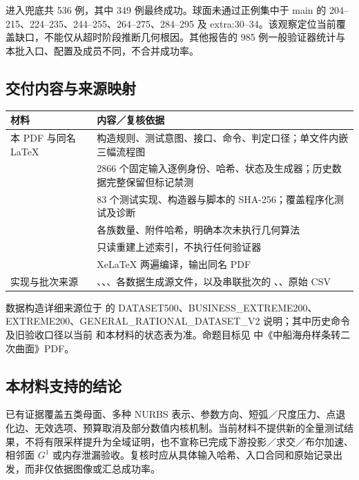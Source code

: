 \documentclass[UTF8,zihao=5,fontset=windows,a4paper]{ctexart}
\begin{document}
进入兜底共 536 例，其中 349 例最终成功。球面未通过正例集中于 main 的 204--215、224--235、244--255、264--275、284--295 及 extra:30--34。该观察定位当前覆盖缺口，不能仅从超时阶段推断几何根因。其他报告的 985 例一般验证器统计与本批入口、配置及成员不同，不合并成功率。

\subsection{交付内容与来源映射}
\begin{center}\small\renewcommand{\arraystretch}{1.16}
\begin{tabularx}{\linewidth}{@{}p{43mm}Y@{}}\toprule
材料 & 内容／复核依据\\\midrule
本 PDF 与同名 LaTeX & 构造规则、测试意图、接口、命令、判定口径；单文件内嵌三幅流程图\\
 & 2866 个固定输入逐例身份、哈希、状态及生成器；历史数据完整保留但标记禁测\\
 & 83 个测试实现、构造器与脚本的 SHA-256；覆盖程序化测试及诊断\\
 & 各族数量、附件哈希，明确本次未执行几何算法\\
 & 只读重建上述索引，不执行任何验证器\\
 & XeLaTeX 两遍编译，输出同名 PDF\\
实现与批次来源 & 、、、各数据生成源文件，以及串联批次的 、、原始 CSV\\\bottomrule
\end{tabularx}
\end{center}
数据构造详细来源位于  的 DATASET500、BUSINESS\_EXTREME200、EXTREME200、GENERAL\_RATIONAL\_DATASET\_V2 说明；其中历史命令及旧验收口径以当前  和本材料的状态表为准。命题目标见  中《中船海舟样条转二次曲面》PDF。

\subsection{本材料支持的结论}
已有证据覆盖五类母面、多种 NURBS 表示、参数方向、短弧／尺度压力、点退化边、无效选项、预算取消及部分数值内核机制。当前材料不提供新的全量测试结果，不将有限采样提升为全域证明，也不宣称已完成下游投影／求交／布尔加速、相邻面 $G^1$ 或内存泄漏验收。复核时应从具体输入哈希、入口合同和原始记录出发，而非仅依据图像或汇总成功率。
\end{document}
